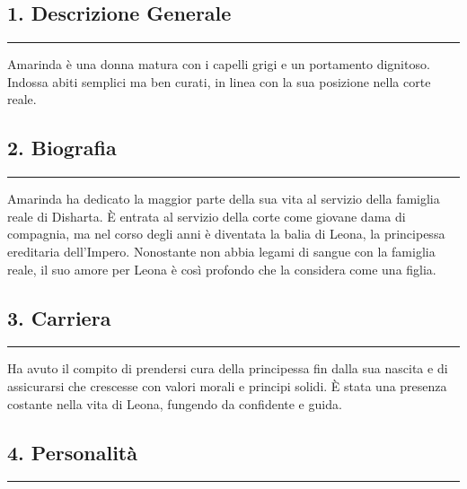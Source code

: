 \subsection{1. Descrizione Generale}\label{descrizione-generale}

\begin{center}\rule{0.5\linewidth}{0.5pt}\end{center}

Amarinda è una donna matura con i capelli grigi e un portamento
dignitoso. Indossa abiti semplici ma ben curati, in linea con la sua
posizione nella corte reale.

\subsection{2. Biografia}\label{biografia}

\begin{center}\rule{0.5\linewidth}{0.5pt}\end{center}

Amarinda ha dedicato la maggior parte della sua vita al servizio della
famiglia reale di Disharta. È entrata al servizio della corte come
giovane dama di compagnia, ma nel corso degli anni è diventata la balia
di Leona, la principessa ereditaria dell'Impero. Nonostante non abbia
legami di sangue con la famiglia reale, il suo amore per Leona è così
profondo che la considera come una figlia.

\subsection{3. Carriera}\label{carriera}

\begin{center}\rule{0.5\linewidth}{0.5pt}\end{center}

Ha avuto il compito di prendersi cura della principessa fin dalla sua
nascita e di assicurarsi che crescesse con valori morali e principi
solidi. È stata una presenza costante nella vita di Leona, fungendo da
confidente e guida.

\subsection{4. Personalità}\label{personalituxe0}

\begin{center}\rule{0.5\linewidth}{0.5pt}\end{center}

